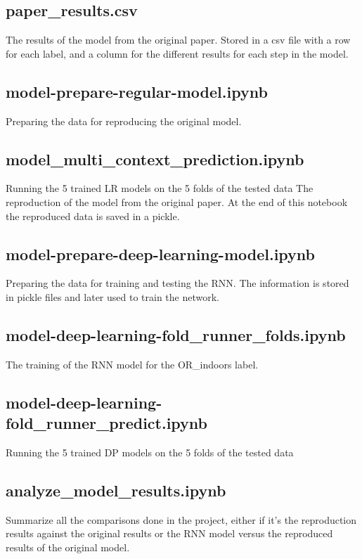 \documentclass{article}
\begin{document}
\subsection{paper\_results.csv}
The results of the model from the original paper. Stored in a csv file with a row for each label, and a column for the different results for each step in the model.

\subsection{model-prepare-regular-model.ipynb}
Preparing the data for reproducing the original model.

\subsection{model\_multi\_context\_prediction.ipynb}
Running the 5 trained LR models on the 5 folds of the tested data
The reproduction of the model from the original paper. At the end of this notebook the reproduced data is saved in a pickle.

\subsection{model-prepare-deep-learning-model.ipynb}
Preparing the data for training and testing the RNN. The information is stored in pickle files and later used to train the network.

\subsection{model-deep-learning-fold\_runner\_folds.ipynb}
The training of the RNN model for the OR\_indoors label.

\subsection{model-deep-learning-fold\_runner\_predict.ipynb}
Running the 5 trained DP models on the 5 folds of the tested data

\subsection{analyze\_model\_results.ipynb}
Summarize all the comparisons done in the project, either if it's the reproduction results against the original results or the RNN model versus the reproduced results of the original model.




\end{document}

